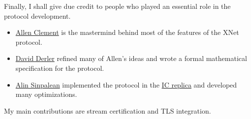 \documentclass{article}
\begin{document}
Finally, I shall give due credit to people who played an essential role in the protocol development.
\begin{itemize}
\item
  \href{https://www.linkedin.com/in/allen-clement-b73a4652/}{Allen Clement} is the mastermind behind most of the features of the XNet protocol.
\item
  \href{https://www.linkedin.com/in/david-derler-08630495/}{David Derler} refined many of Allen's ideas and wrote a formal mathematical specification for the protocol.
\item
  \href{https://www.linkedin.com/in/alin-sinpalean-8451b8139/}{Alin Sinpalean} implemented the protocol in the \href{https://github.com/dfinity/ic/tree/3fe4137c86ab0521c39089954c03d7fb29e2c3d2/rs/xnet}{IC replica} and developed many optimizations.
\end{itemize}

My main contributions are stream certification and TLS integration.
\end{document}
